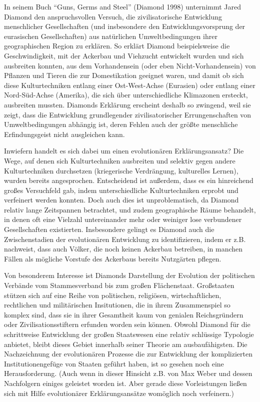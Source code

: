 \documentclass[12pt,a4paper,ngerman]{article}
\begin{document}
In seinem Buch "`Guns, Germs and Steel"' (Diamond 1998) unternimmt Jared
Diamond den anspruchsvollen Versuch, die zivilisatorische Entwicklung
menschlicher Gesellschaften (und insbesondere den Entwicklungsvorsprung der
eurasischen Gesellschaften) aus natürlichen Umweltbedingungen ihrer
geographischen Region zu erklären. So erklärt Diamond beispielsweise die
Geschwindigkeit, mit der Ackerbau und Viehzucht entwickelt wurden und sich
ausbreiten konnten, aus dem Vorhandensein (oder eben Nicht-Vorhandensein) von
Pflanzen und Tieren die zur Domestikation geeignet waren, und damit ob sich
diese Kulturtechniken entlang einer Ost-West-Achse (Eurasien) oder entlang
einer Nord-Süd-Achse (Amerika), die sich über unterschiedliche Klimazonen
ersteckt, ausbreiten mussten.  Diamonds Erklärung erscheint deshalb so
zwingend, weil sie zeigt, dass die Entwicklung grundlegender zivilisatorischer
Errungenschaften von Umweltbedingungen abhängig ist, deren Fehlen auch der
größte menschliche Erfindungsgeist nicht ausgleichen kann.

Inwiefern handelt es sich dabei um einen evolutionären
Erklärungsansatz? Die Wege, auf denen sich Kulturtechniken ausbreiten
und selektiv gegen andere Kulturtechniken durchsetzen (kriegerische
Verdrängung, kulturelles Lernen), wurden bereits
angesprochen. Entscheidend ist außerdem, dass es ein hinreichend
großes Versuchfeld gab, indem unterschiedliche Kulturtechniken erprobt
und verfeinert werden konnten. Doch auch dies ist unproblematisch, da
Diamond relativ lange Zeitspannen betrachtet, und zudem geographische
Räume behandelt, in denen oft eine Vielzahl untereinander mehr oder
weiniger lose verbundener Gesellschaften existierten. Insbesondere
gelingt es Diamond auch die Zwischenstadien der evolutionären
Entwicklung zu identifizieren, indem er z.B. nachweist, dass auch
Völker, die noch keinen Ackerbau betreiben, in manchen Fällen als
mögliche Vorstufe des Ackerbaus bereits Nutzgärten pflegen.

Von besonderem Interesse ist Diamonds Darstellung der Evolution der
politischen Verbände vom Stammesverband bis zum großen Flächenstaat.
Großstaaten stützen sich auf eine Reihe von politischen, religiösen,
wirtschaftlichen, rechtlichen und militärischen Insitutionen, die in
ihrem Zusammenspiel so komplex sind, dass sie in ihrer Gesamtheit kaum
von genialen Reichsgründern oder Zivilisationsstiftern erfunden worden
sein können. Obwohl Diamond für die schrittweise Entwicklung der
großen Staatswesen eine relativ schlüssige Typologie anbietet, bleibt
dieses Gebiet innerhalb seiner Theorie am ausbaufähigsten. Die
Nachzeichnung der evolutionären Prozesse die zur Entwicklung der
komplizierten Institutionengefüge von Staaten geführt haben, ist so
gesehen noch eine Herausforderung. (Auch wenn in dieser Hinsicht z.B.
von Max Weber und dessen Nachfolgern einiges geleistet worden
ist. Aber gerade diese Vorleistungen ließen sich mit Hilfe
evolutionärer Erklärungsansätze womöglich noch verfeinern.)
\end{document}
